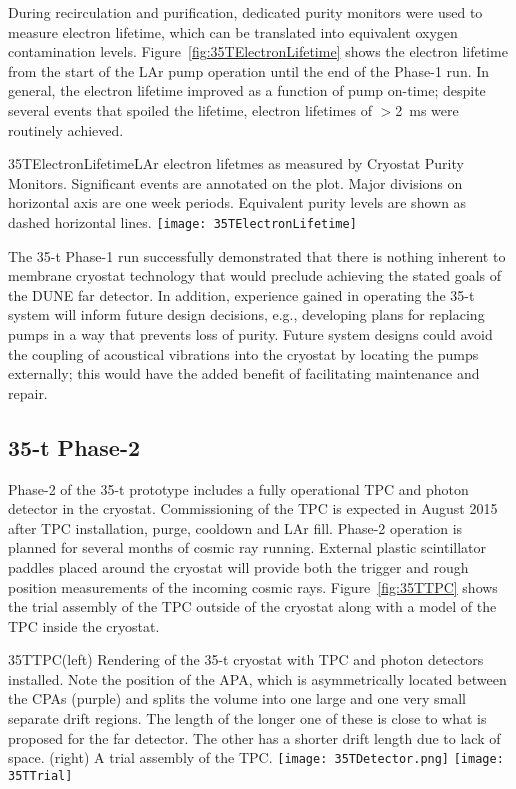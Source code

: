 During recirculation and purification, dedicated purity monitors were
used to measure electron lifetime, which can be translated into
equivalent oxygen contamination levels.
Figure~\ref{fig:35TElectronLifetime} shows the electron lifetime from
the start of the LAr pump operation until the end of the Phase-1 run.
In general, the electron lifetime improved as a function of pump
on-time; despite several events that spoiled the lifetime, 
electron lifetimes of $>$2~ms were routinely achieved.
\begin{cdrfigure}{35TElectronLifetime}{LAr electron lifetmes as measured by
Cryostat Purity Monitors. Significant events are annotated on the plot. Major divisions on horizontal axis
are one week periods. Equivalent purity levels are shown as dashed horizontal lines.}
\texttt{[image: 35TElectronLifetime]}
\end{cdrfigure}

The 35-t Phase-1 run successfully demonstrated that there is nothing
inherent to membrane cryostat technology that would preclude achieving
the stated goals of the DUNE far detector. In addition, experience
gained in operating the 35-t system will inform future design
decisions, e.g., developing plans for replacing pumps in a way that
prevents loss of purity.  Future system designs could avoid the
coupling of acoustical vibrations into the cryostat by locating the
pumps externally; this would have the added benefit of facilitating
maintenance and repair.

\subsection{35-t Phase-2}
\label{sec:proto-35t-ph2}

Phase-2 of the 35-t prototype includes a fully operational TPC and
photon detector in the cryostat.  Commissioning of the TPC is expected
in August 2015 after TPC installation, purge, cooldown and LAr fill. 
Phase-2 operation is planned for several months of cosmic ray running.
External plastic scintillator paddles placed around the cryostat will
provide both the trigger and rough position measurements of the
incoming cosmic rays.  Figure~\ref{fig:35TTPC} shows the trial
assembly of the TPC outside of the cryostat along with a model of the
TPC inside the cryostat.
\begin{cdrfigure}{35TTPC}{(left) Rendering of the
35-t cryostat with TPC and photon detectors installed.  Note the
position of the APA, which is asymmetrically located between the CPAs
(purple) and splits the volume into one large and one very small %
separate drift regions.  The length of the longer one of these is
close to what is proposed for the far detector.  The other has a
shorter drift length due to lack of space.  (right) A trial assembly
of the TPC.  } \texttt{[image: 35TDetector.png]}
  \texttt{[image: 35TTrial]}
\end{cdrfigure}

